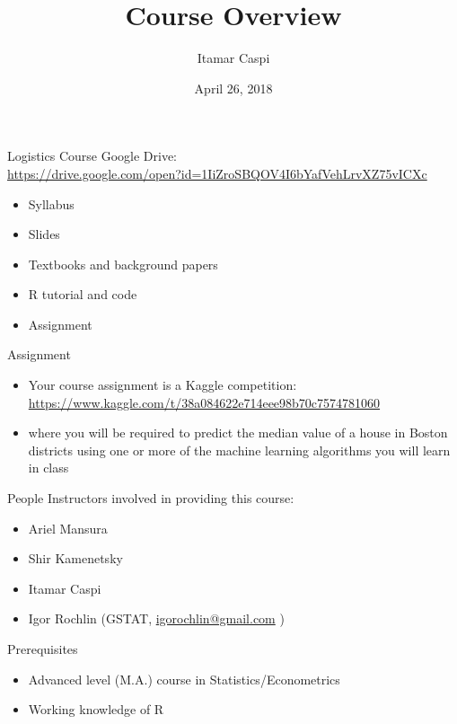 \documentclass[]{beamer}
\title{{\large Course Overview}}
\date{April 26, 2018}
\author{Itamar Caspi}
\institute{ml4e @ HUJI, 2018}
\begin{document}
\maketitle

\begin{frame}{Logistics}
Course Google Drive:\\
\url{https://drive.google.com/open?id=1IiZroSBQOV4I6bYafVehLrvXZ75vICXc}
\begin{itemize}
\item Syllabus
\item Slides
\item Textbooks and background papers
\item R tutorial and code
\item Assignment
\end{itemize}
\end{frame}

\begin{frame}{Assignment}
\begin{itemize}
\item Your course assignment is a Kaggle competition:
\url{https://www.kaggle.com/t/38a084622e714eee98b70c7574781060}
\item where you will be required to predict the median value of a house in Boston districts using one or more of the machine learning algorithms you will learn in class
\end{itemize}
\end{frame}

\begin{frame}{People}
Instructors involved in providing this course:
\begin{itemize}
\item Ariel Mansura
\item Shir Kamenetsky
\item Itamar Caspi
\item Igor Rochlin (GSTAT, \url{igorochlin@gmail.com} )
\end{itemize}
\end{frame}

\begin{frame}{Prerequisites}
\begin{itemize}
\item Advanced level (M.A.) course in Statistics/Econometrics
\item Working knowledge of R
\end{itemize}

\end{frame}
\end{document}
